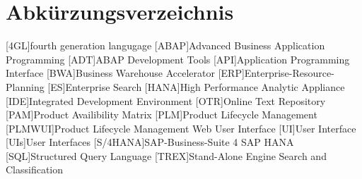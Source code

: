 \clearpage
\chapter*{Abkürzungsverzeichnis}	

\begin{acronym}[XXXXXXX]
	[4GL]{fourth generation langugage}
	[ABAP]{Advanced Business Application Programming}
	[ADT]{ABAP Development Tools}
	[API]{Application Programming Interface}
	[BWA]{Business Warehouse Accelerator}
	[ERP]{Enterprise-Resource-Planning}
	[ES]{Enterprise Search}
	[HANA]{High Performance Analytic Appliance}
	[IDE]{Integrated Development Environment}
	[OTR]{Online Text Repository}
	[PAM]{Product Availibility Matrix}
	[PLM]{Product Lifecycle Management}
	[PLMWUI]{Product Lifecycle Management Web User Interface}
	[UI]{User Interface}
	[UIs]{User Interfaces}
	[S/4HANA]{SAP-Business-Suite 4 SAP HANA}
	[SQL]{Structured Query Language}
	[TREX]{Stand-Alone Engine Search and Classification}
\end{acronym}